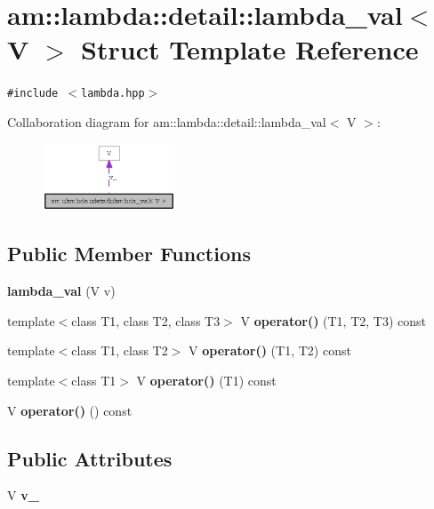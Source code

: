 \section{am::lambda::detail::lambda\_\-val$<$ V $>$ Struct Template Reference}
\label{structam_1_1lambda_1_1detail_1_1lambda__val}
{\tt \#include $<$lambda.hpp$>$}

Collaboration diagram for am::lambda::detail::lambda\_\-val$<$ V $>$:\begin{figure}[H]
\begin{center}
\leavevmode
\includegraphics[width=112pt]{structam_1_1lambda_1_1detail_1_1lambda__val__coll__graph}
\end{center}
\end{figure}
\subsection*{Public Member Functions}
\begin{CompactItemize}
\item 
\textbf{lambda\_\-val} (V v)\label{structam_1_1lambda_1_1detail_1_1lambda__val_7152b6d4b085a10c679da302ebdeefac}

\item 
template$<$class T1, class T2, class T3$>$ V \textbf{operator()} (T1, T2, T3) const\label{structam_1_1lambda_1_1detail_1_1lambda__val_b831b0cc665d247776a5d0af6649ea7e}

\item 
template$<$class T1, class T2$>$ V \textbf{operator()} (T1, T2) const\label{structam_1_1lambda_1_1detail_1_1lambda__val_7dbcaa00f48521394febabb47a7779c9}

\item 
template$<$class T1$>$ V \textbf{operator()} (T1) const\label{structam_1_1lambda_1_1detail_1_1lambda__val_e1f756565171002df3161eeb0ae772da}

\item 
V \textbf{operator()} () const\label{structam_1_1lambda_1_1detail_1_1lambda__val_88d28ac1d9f6617f0a85b981db82cdfe}

\end{CompactItemize}
\subsection*{Public Attributes}
\begin{CompactItemize}
\item 
V \textbf{v\_\-}\label{structam_1_1lambda_1_1detail_1_1lambda__val_683416856f8594b8f4a17e50ba53833c}

\end{CompactItemize}


